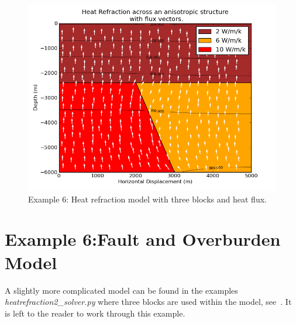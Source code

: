 \begin{figure}[ht]
\centerline{\includegraphics[width=4.in]{figures/heatrefraction2flux}}
\caption{Example 6: Heat refraction model with three blocks and heat flux.}
\label{fig:hr002qumodel}
\end{figure}

\section{Example 6:Fault and Overburden Model}
A slightly more complicated model can be found in the examples
\textit{heatrefraction2_solver.py} where three blocks are used within the model,
see~. It is left to the reader to work through this
example.


